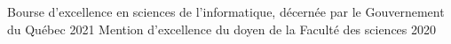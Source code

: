



\begin{cvhonors}

  \cvhonor
    {} %
    {Bourse d'excellence en sciences de l'informatique, décernée par le Gouvernement du Québec} %
    {} %
    {2021} %
  \cvhonor
    {} %
    {Mention d'excellence du doyen de la Faculté des sciences} %
    {} %
    {2020} %
\end{cvhonors}
